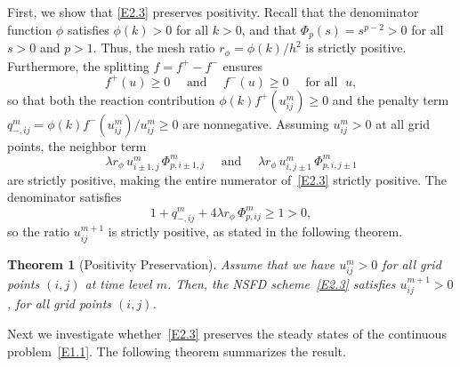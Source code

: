 \documentclass[final,12pt,3p]{elsarticle}
\theoremstyle{plain}
\newtheorem{theorem}{Theorem}
\theoremstyle{definition}
\theoremstyle{remark}
\begin{document}
First, we show that \eqref{E2.3} preserves positivity.
Recall that the denominator function $\phi$ satisfies $\phi(k) > 0$ for all $k > 0$, and that $\Phi_p(s) = s^{p-2} > 0$ for all $s > 0$ and $p > 1$.
Thus, the mesh ratio $r_\phi = \phi(k)/h^2$ is strictly positive.
Furthermore, the splitting $f = f^+ - f^-$ ensures 
\begin{equation*}
   f^+(u) \ge0 \quad\text{ and } \quad f^-(u) \ge0 \quad  \text{ for all } \;  u,
\end{equation*} 
so that both the reaction contribution $\phi(k)f^+(u_{ij}^m) \ge0$ 
and the penalty term $q_{-,ij}^m = \phi(k)f^-(u_{ij}^m)/u_{ij}^m \ge0$ are nonnegative.
Assuming $u_{ij}^m > 0$ at all grid points, the neighbor term
\begin{equation*}
\lambda r_\phi\, u_{i\pm 1,j}^m\,\Phi_{p,i\pm 1,j}^m \quad \text{ and } \quad 
\lambda r_\phi\, u_{i,j\pm 1}^m\,\Phi_{p,i,j\pm 1}^m
\end{equation*}
are strictly positive, making the entire numerator of~\eqref{E2.3} strictly positive.
The denominator satisfies 
\begin{equation*}
    1 + q_{-,ij}^m + 4\lambda r_\phi\,\Phi_{p,ij}^m \ge1 > 0,
\end{equation*}
so the ratio $u_{ij}^{m+1}$ is strictly positive, as stated in the following theorem.


\begin{theorem}[Positivity Preservation]\label{T1}
Assume that we have $u_{ij}^m>0$ for all grid points $(i,j)$ at time level $m$. 
Then, the NSFD scheme~\eqref{E2.3} satisfies $u_{ij}^{m+1} > 0$, for all grid points $(i,j)$.
\end{theorem}

Next we investigate whether~\eqref{E2.3} preserves the steady states of the continuous problem~\eqref{E1.1}. 
The following theorem summarizes the result.
\end{document}
